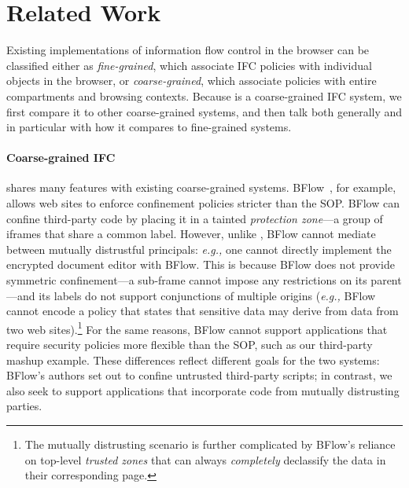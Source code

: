 \section{Related Work}
\label{sec:related}

Existing implementations of information flow control in the browser can
be classified either as \emph{fine-grained}, which associate IFC
policies with individual objects in the browser, or
\emph{coarse-grained}, which associate policies with
entire compartments and browsing contexts.  Because \sys{} is a
coarse-grained IFC system, we first compare it to other coarse-grained
systems, and then talk both generally and in particular with how
it compares to fine-grained systems.

\paragraph{Coarse-grained IFC} \sys{} shares many features
with existing coarse-grained systems.
%
BFlow~\cite{Yip:2009:PBS}, for example, allows web sites to enforce confinement policies
stricter than the SOP\@.
%
BFlow can confine third-party code by placing
it in a tainted \emph{protection zone}---a group
of iframes that share a common label.
%
However, unlike \sys{}, BFlow cannot mediate between mutually
distrustful principals: \emph{e.g.,} one cannot directly implement the
encrypted document editor with BFlow.
%
This is because BFlow does not provide symmetric confinement---a
sub-frame cannot impose any restrictions on its parent---and its
labels do not support conjunctions of multiple origins (\emph{e.g.,} BFlow
cannot encode a policy that states that sensitive data may derive from
data from two web sites).\footnote{ The mutually distrusting scenario
  is further complicated by BFlow's reliance on top-level
  \emph{trusted zones} that can always \emph{completely} declassify
  the data in their corresponding page.}
%
For the same reasons, BFlow cannot support applications that require
security policies more flexible than the SOP, such as our third-party
mashup example.
%
These differences reflect different goals for the two systems: BFlow's
authors set out to confine untrusted third-party scripts; in contrast,
we also seek to support applications that incorporate code from mutually
distrusting parties.


